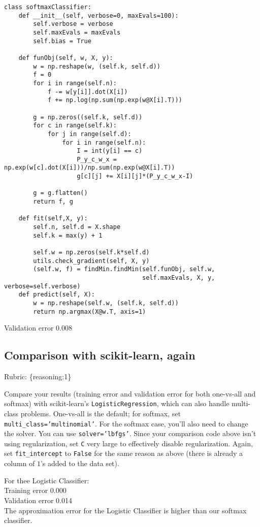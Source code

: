 \documentclass{article}
\def\rubric#1{\gre{Rubric: \{#1\}}}{}
\def\gre#1{{\color{gre}#1}}
\def\red#1{{\color{red}#1}}
\begin{document}
\begin{lstlisting}
class softmaxClassifier:
    def __init__(self, verbose=0, maxEvals=100):
        self.verbose = verbose
        self.maxEvals = maxEvals
        self.bias = True

    def funObj(self, w, X, y):
        w = np.reshape(w, (self.k, self.d))
        f = 0
        for i in range(self.n):
            f -= w[y[i]].dot(X[i])
            f += np.log(np.sum(np.exp(w@X[i].T)))

        g = np.zeros((self.k, self.d))
        for c in range(self.k):
            for j in range(self.d):
                for i in range(self.n):
                    I = int(y[i] == c)
                    P_y_c_w_x = np.exp(w[c].dot(X[i]))/np.sum(np.exp(w@X[i].T))
                    g[c][j] += X[i][j]*(P_y_c_w_x-I)

        g = g.flatten()
        return f, g

    def fit(self,X, y):
        self.n, self.d = X.shape
        self.k = max(y) + 1

        self.w = np.zeros(self.k*self.d)
        utils.check_gradient(self, X, y)
        (self.w, f) = findMin.findMin(self.funObj, self.w,
                                      self.maxEvals, X, y, verbose=self.verbose)
    def predict(self, X):
        w = np.reshape(self.w, (self.k, self.d))
        return np.argmax(X@w.T, axis=1)
\end{lstlisting}

\red{Validation error 0.008}

\subsection{Comparison with scikit-learn, again}
\rubric{reasoning:1}

Compare your results (training error and validation error for both one-vs-all and softmax) with scikit-learn's \texttt{LogisticRegression},
which can also handle multi-class problems.
One-vs-all is the default; for softmax, set \texttt{multi\string_class='multinomial'}. For the softmax case,
you'll also need to change the solver. You can use \texttt{solver='lbfgs'}.
Since your comparison code above isn't using regularization, set \texttt{C} very large to effectively disable regularization.
Again, set \texttt{fit\string_intercept} to \texttt{False} for the same reason as above (there is already a column of $1$'s added to the data set).

\red{
For thee Logistic Classifier: \\
Training error 0.000 \\
Validation error 0.014 \\
The approximation error for the Logistic Classifier is higher than our softmax classifier.}
\end{document}
